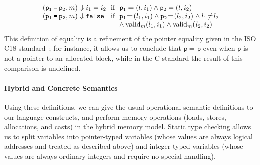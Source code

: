 \[\begin{array}{@{}l@{~}l@{}}
(\mathtt{p_1 \mathbin{\code{=}} p_2}, m) \Downarrow i_1 = i_2 & \text{ if }~ \mathtt{p_1} = (l, i_1) \land \mathtt{p_2} = (l, i_2) \\
(\mathtt{p_1 \mathbin{\code{=}} p_2}, m) \Downarrow \code{false} & \text{ if }~ 
\mathtt{p_1} \!=\! (l_1, i_1) \land \mathtt{p_2} \!=\! (l_2, i_2) \land l_1 \!\neq\! l_2 \\
  & \quad{}~ \land \text{valid}_m(l_1,i_1) \land \text{valid}_m(l_2,i_2) \\
\end{array}
\]
This definition of equality is a refinement of the pointer equality given in the ISO C18
standard~\cite[\S6.5.9p6]{c18}; for instance, it allows us to conclude that $\mathtt{p = p}$ even
when $\mathtt{p}$ is not a pointer to an allocated block, while in the C standard the result of this
comparison is undefined.


\paragraph{Hybrid and Concrete Semantics}
Using these definitions, we can give the usual operational semantic definitions to our language constructs, and perform memory operations (loads, stores, allocations, and casts) in the hybrid memory model. Static type checking allows us to split variables into pointer-typed variables (whose values are %
always logical addresses
and treated as described above) and integer-typed variables (whose values are always ordinary integers and require no special handling). 


